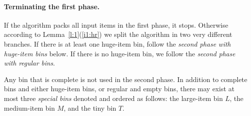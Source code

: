 \paragraph{Terminating the first phase. } If the algorithm packs all
input items in the first phase, it stops. Otherwise according to
Lemma~\ref{l:1}(\ref{i1:hr}) we split the algorithm in two very
different branches. If there is at least one huge-item bin, follow the
\emph{second phase with huge-item bins} below. If there is no huge-item bin,
we follow the \emph{second phase with regular bins}.

Any bin that is complete is not used in the second phase. In addition
to complete bins and either huge-item bins, or regular and empty bins,
there may exist at most three \emph{special bins} denoted and ordered
as follows: the large-item bin $L$, the medium-item bin $M$, and the
tiny bin $T$.

